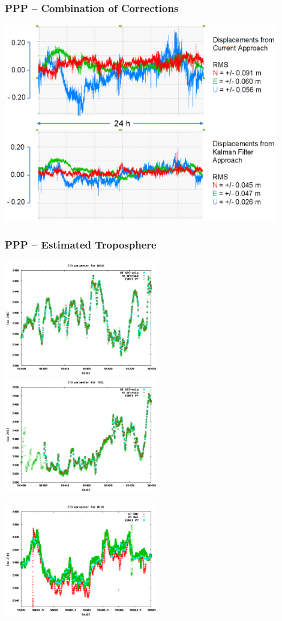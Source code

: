 \documentclass[10pt]{beamer}
\begin{document}
\begin{frame}
\frametitle{PPP -- Combination of Corrections}
  \begin{center}
    \includegraphics[width=0.9\textwidth,angle=0]{combination_3.png}
  \end{center}
\end{frame}


\begin{frame}
\frametitle{PPP -- Estimated Troposphere}
\includegraphics[width=0.5\textwidth,angle=0]{tropo1.png}
\includegraphics[width=0.5\textwidth,angle=0]{tropo2.png}

\includegraphics[width=0.5\textwidth,angle=0]{tropo3.png}
\end{frame}
\end{document}
